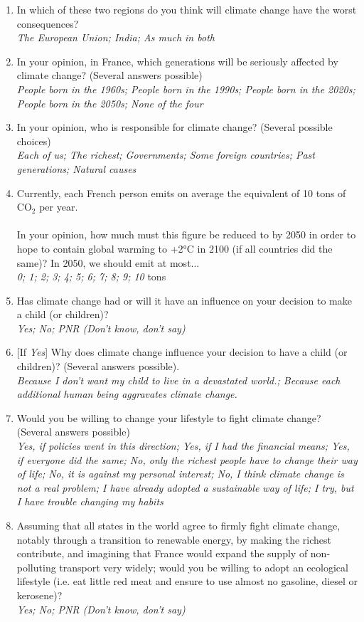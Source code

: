 \documentclass[english,5p,authoryear]{elsarticle}
\begin{document}
\begin{appendices}
\begin{enumerate}[resume,leftmargin=*]
{disasters; Disastrous, lifestyles would be largely altered; Cataclysmic,
humankind would disappear; PNR(Don't know, don't say) }
\item In which of these two regions do you think will climate change have
the worst consequences? \emph{}\\
\emph{The European Union; India; As much in both }
\item In your opinion, in France, which generations will be seriously affected
by climate change? (Several answers possible) \emph{}\\
\emph{People born in the 1960s; People born in the 1990s; People born
in the 2020s; People born in the 2050s; None of the four }
\item In your opinion, who is responsible for climate change? (Several possible
choices) \emph{}\\
\emph{Each of us; The richest; Governments; Some foreign countries;
Past generations; Natural causes }
\item Currently, each French person emits on average the equivalent of 10
tons of CO$_{2}$ per year. \\
\\
In your opinion, how much must this figure be reduced to by 2050 in
order to hope to contain global warming to +2°C in 2100 (if all countries
did the same)? In 2050, we should emit at most... \emph{}\\
\emph{0; 1; 2; 3; 4; 5; 6; 7; 8; 9; 10} tons 
\item Has climate change had or will it have an influence on your decision
to make a child (or children)?\emph{ }\\
\emph{Yes; No; PNR (Don't know, don't say)}
\item {[}If \emph{Yes}{]} Why does climate change influence your decision
to have a child (or children)? (Several answers possible). \emph{}\\
\emph{Because I don't want my child to live in a devastated world.;
Because each additional human being aggravates climate change.}
\item Would you be willing to change your lifestyle to fight climate change?
(Several answers possible) \emph{}\\
\emph{Yes, if policies went in this direction; Yes, if I had the financial
means; Yes, if everyone did the same; No, only the richest people
have to change their way of life; No, it is against my personal interest;
No, I think climate change is not a real problem; I have already adopted
a sustainable way of life; I try, but I have trouble changing my habits} 
\item Assuming that all states in the world agree to firmly fight climate
change, notably through a transition to renewable energy, by making the richest contribute, and imagining that France would expand the
supply of non-polluting transport very widely; would you be willing
to adopt an ecological lifestyle (i.e. eat little red meat and ensure
to use almost no gasoline, diesel or kerosene)? \emph{}\\
\emph{Yes; No; PNR (Don't know, don't say) }
\end{enumerate}


\end{appendices}
\end{document}
